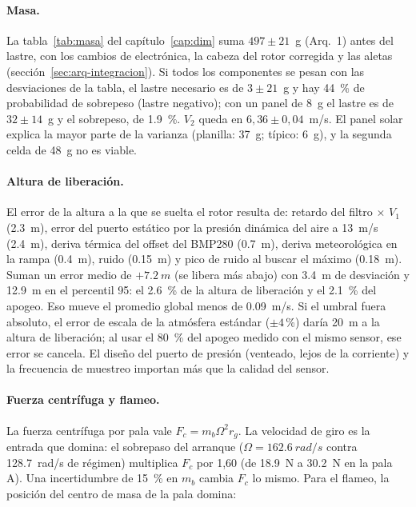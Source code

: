 \paragraph{Masa.} La tabla~\ref{tab:masa} del capítulo~\ref{cap:dim} suma $497\pm21$~g
(Arq.~1) antes del lastre, con los cambios de electrónica, la cabeza del rotor corregida y las aletas
(sección~\ref{sec:arq-integracion}). Si todos los componentes se pesan con las desviaciones de la
tabla, el lastre necesario es de $3\pm21$~g y hay \SI{44}{\percent} de probabilidad de
sobrepeso (lastre negativo); con un panel de \SI{8}{g} el lastre es de $32\pm14$~g y el sobrepeso, de
\SI{1.9}{\percent}. $V_2$ queda
en $6{,}36\pm0{,}04$~m/s. El panel solar explica la mayor parte de la varianza (planilla:
\SI{37}{g}; típico: \SI{6}{g}), y la segunda celda de \SI{48}{g} no es viable.

\paragraph{Altura de liberación.} El error de la altura a la que se suelta el rotor
resulta de: retardo del filtro $\times$ $V_1$ (\SI{2.3}{m}), error del puerto estático por
la presión dinámica del aire a \SI{13}{m/s} (\SI{2.4}{m}), deriva térmica del offset del
BMP280 (\SI{0.7}{m}), deriva meteorológica en la rampa (\SI{0.4}{m}), ruido (\SI{0.15}{m}) y
pico de ruido al buscar el máximo (\SI{0.18}{m}). Suman un error medio de $+\SI{7.2}{m}$
(se libera más abajo) con \SI{3.4}{m} de desviación y \SI{12.9}{m} en el percentil 95: el
\SI{2.6}{\percent} de la altura de liberación y el \SI{2.1}{\percent} del apogeo. Eso mueve el
promedio global menos de \SI{0.09}{m/s}. Si el umbral fuera absoluto, el error de escala de la
atmósfera estándar ($\pm4$\,\%) daría \SI{20}{m} a la altura de liberación; al usar el
\SI{80}{\percent} del apogeo medido con el mismo sensor, ese error se cancela. El diseño del puerto de presión (venteado, lejos de la corriente) y la
frecuencia de muestreo importan más que la calidad del sensor.

\paragraph{Fuerza centrífuga y flameo.} La fuerza centrífuga por pala vale
$F_c=m_b\Omega^2r_g$. La velocidad de giro es la entrada que domina: el sobrepaso del
arranque ($\Omega=\SI{162.6}{rad/s}$ contra \SI{128.7}{rad/s} de régimen) multiplica $F_c$ por
1,60 (de \SI{18.9}{N} a \SI{30.2}{N} en la pala A). Una incertidumbre de \SI{15}{\percent} en
$m_b$ cambia $F_c$ lo mismo. Para el flameo, la posición del centro de masa de la pala domina:

